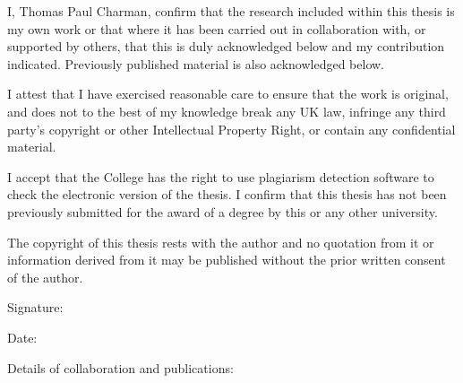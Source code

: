 I, Thomas Paul Charman, confirm that the research included within this thesis is
my own work or that where it has been carried out in collaboration with, or
supported by others, that this is duly acknowledged below and my contribution
indicated. Previously published material is also acknowledged below.

I attest that I have exercised reasonable care to ensure that the work is
original, and does not to the best of my knowledge break any UK law, infringe
any third party’s copyright or other Intellectual Property Right, or contain any
confidential material.

I accept that the College has the right to use plagiarism detection software to
check the electronic version of the thesis. I confirm that this thesis has not
been previously submitted for the award of a degree by this or any other
university.

The copyright of this thesis rests with the author and no quotation from it or
information derived from it may be published without the prior written consent
of the author.

\vspace{2cm}
\noindent Signature:

\noindent Date:

\vspace{1cm}
\noindent Details of collaboration and publications:
\clearpage